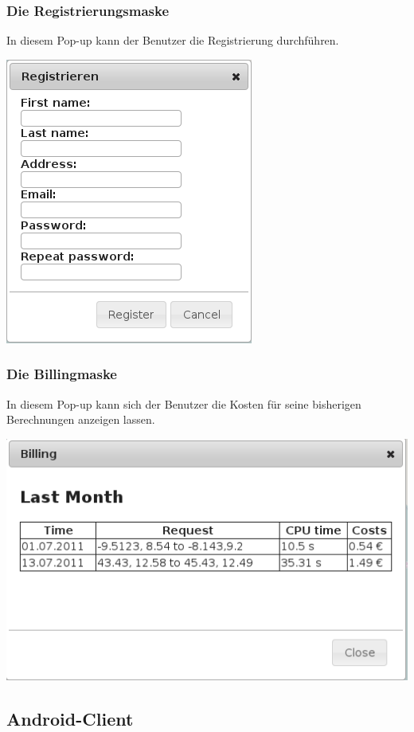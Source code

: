 \documentclass[a4paper,10pt,titlepage]{article}
\begin{document}
\subsubsection{Die Registrierungsmaske}
In diesem Pop-up kann der Benutzer die Registrierung durchführen.
\begin {center}
\includegraphics[scale=0.5]{media/web/Register.png}
\end {center}
\subsubsection{Die Billingmaske}
In diesem Pop-up kann sich der Benutzer die Kosten für seine bisherigen Berechnungen anzeigen lassen.
\begin {center}
\includegraphics[scale=0.5]{media/web/Billing.png}
\end {center}

\newpage
\subsection{Android-Client}
\end{document}
